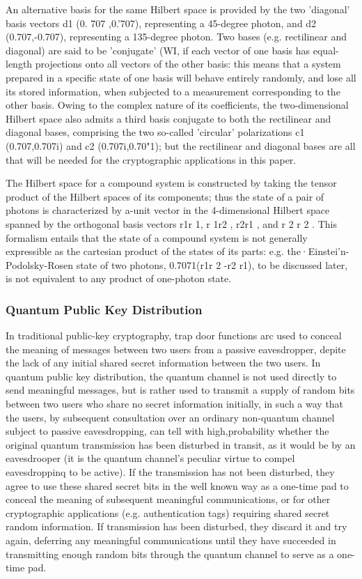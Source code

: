 An alternative basis for the same Hilbert space is provided by the two 'diagonal' basis vec­tors d1 (0. 707 ,0.'707), representing a 45-degree photon, and d2 (0.707,-0.707), representing a 135-degree photon. Two bases (e.g. rectilinear and diagonal) are said to be 'conjugate' (WI, if each vector of one basis has equal-length projections onto all vectors of the other basis: this means that a system prepared in a specific state of one basis will behave entirely randomly, and lose all its stored information, when subjected to a measurement corresponding to the other basis. Owing to the com­plex nature of its coefficients, the two-dimensional Hilbert space also admits a third basis conjugate to both the rectilinear and diagonal bases, comprising the two so-called 'circular' polarizations c1 (0.707,0.707i) and c2 (0.707i,0.70"1); but the rectilinear and diagonal bases are all that will be needed for the cryptographic applications in this paper.

The Hilbert space for a compound system is constructed by taking the tensor product of the Hil­bert spaces of its components; thus the state of a pair of photons is characterized by a-unit vector in the 4-dimensional Hilbert space spanned by the or­thogonal basis vectors r1r 1, r 1r2 , r2r1 , and r 2 r 2 . This formalism entails that the state of a compound system is not generally expressible as the cartesian product of the states of its parts: e.g. the·Einstei'n-Podolsky-Rosen state of two photons, 0.7071(r1r 2 -r2 r1), to be discussed later, is not equivalent to any product of one-photon state.

\subsubsection{Quantum Public Key Distribution}

In traditional public-key cryptography, trap ­door functions arc used to conceal the meaning of messages between two users from a passive eavesdrop­per, depite the lack of any initial shared secret information between the two users. In quantum pub­lic key distribution, the quantum channel is not used directly to send meaningful messages, but is rather used to transmit a supply of random bits be­tween two users who share no secret information ini­tially, in such a way that the users, by subsequent consultation over an ordinary non-quantum channel subject to passive eavesdropping, can tell with high,probability whether the original quantum transmis­sion has been disturbed in transit, as it would be by an eavesdrooper (it is the quantum channel's pe­culiar virtue to compel eavesdroppinq to be active). If the transmission has not been disturbed, they agree to use these shared secret bits in the well ­known way as a one-time pad to conceal the meaning of subsequent meaningful communications, or for oth­er cryptographic applications (e.g. authentication tags) requiring shared secret random information. If transmission has been disturbed, they discard it and try again, deferring any meaningful communica­tions until they have succeeded in transmitting enough random bits through the quantum channel to serve as a one-time pad.

